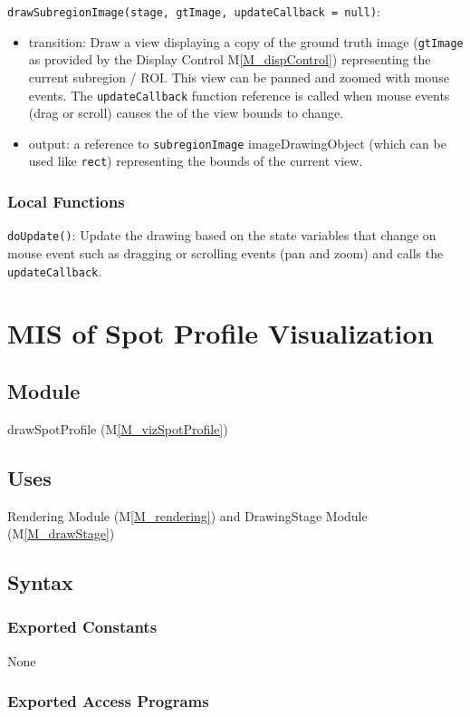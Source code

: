 \documentclass[12pt, titlepage]{article}
\newcommand{\mref}[1]{M\ref{#1}}
\newcommand{\mrefp}[1]{(\mref{#1})}
\newcommand{\mreff}[1]{Module \mrefp{#1}}
\newcommand{\code}[1]{\texttt{#1}}
\begin{document}
\noindent \code{drawSubregionImage(stage, gtImage, updateCallback = null)}:
\begin{itemize}
\item transition: Draw a view displaying a copy of the ground truth image
  (\code{gtImage} as provided by the Display Control \mref{M_dispControl})
  representing the current subregion / ROI.
  This view can be panned and zoomed with mouse events.
  The \code{updateCallback} function reference is called when mouse events (drag or scroll)
  causes the of the view bounds to change.
\item output: a reference to \code{subregionImage} imageDrawingObject
  (which can be used like \code{rect}) representing the bounds of the current view.
\end{itemize}

\subsubsection{Local Functions}
\code{doUpdate()}: Update the drawing based on the state variables that change on mouse event
  such as dragging or scrolling events (pan and zoom) and calls the \code{updateCallback}.

\newpage




\section{MIS of Spot Profile Visualization} \label{MS_vizSpotProfile}

\subsection{Module}
drawSpotProfile \mrefp{M_vizSpotProfile}

\subsection{Uses}
Rendering \mreff{M_rendering} and DrawingStage \mreff{M_drawStage}

\subsection{Syntax}

\subsubsection{Exported Constants}
None
\subsubsection{Exported Access Programs}
\end{document}
